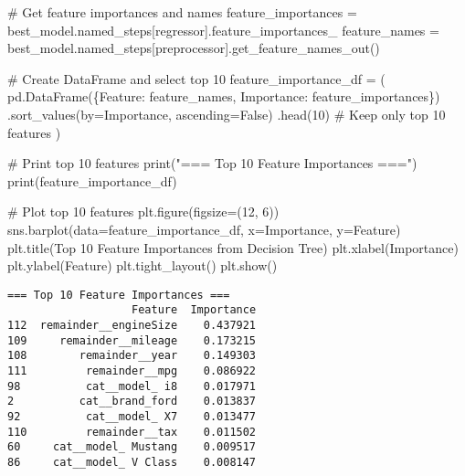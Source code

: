 \documentclass[
  letterpaper,
  DIV=11,
  numbers=noendperiod]{scrreprt}
\newenvironment{Shaded}{\begin{snugshade}}{\end{snugshade}}
\newcommand{\BuiltInTok}[1]{\textcolor[rgb]{0.00,0.23,0.31}{#1}}
\newcommand{\CommentTok}[1]{\textcolor[rgb]{0.37,0.37,0.37}{#1}}
\newcommand{\DecValTok}[1]{\textcolor[rgb]{0.68,0.00,0.00}{#1}}
\newcommand{\NormalTok}[1]{\textcolor[rgb]{0.00,0.23,0.31}{#1}}
\newcommand{\OperatorTok}[1]{\textcolor[rgb]{0.37,0.37,0.37}{#1}}
\newcommand{\StringTok}[1]{\textcolor[rgb]{0.13,0.47,0.30}{#1}}
\newcommand{\VariableTok}[1]{\textcolor[rgb]{0.07,0.07,0.07}{#1}}
\begin{document}
\begin{Shaded}
\begin{Highlighting}[]
\CommentTok{\# Get feature importances and names}
\NormalTok{feature\_importances }\OperatorTok{=}\NormalTok{ best\_model.named\_steps[}\StringTok{\textquotesingle{}regressor\textquotesingle{}}\NormalTok{].feature\_importances\_}
\NormalTok{feature\_names }\OperatorTok{=}\NormalTok{ best\_model.named\_steps[}\StringTok{\textquotesingle{}preprocessor\textquotesingle{}}\NormalTok{].get\_feature\_names\_out()}

\CommentTok{\# Create DataFrame and select top 10}
\NormalTok{feature\_importance\_df }\OperatorTok{=}\NormalTok{ (}
\NormalTok{    pd.DataFrame(\{}\StringTok{\textquotesingle{}Feature\textquotesingle{}}\NormalTok{: feature\_names, }\StringTok{\textquotesingle{}Importance\textquotesingle{}}\NormalTok{: feature\_importances\})}
\NormalTok{    .sort\_values(by}\OperatorTok{=}\StringTok{\textquotesingle{}Importance\textquotesingle{}}\NormalTok{, ascending}\OperatorTok{=}\VariableTok{False}\NormalTok{)}
\NormalTok{    .head(}\DecValTok{10}\NormalTok{)  }\CommentTok{\# Keep only top 10 features}
\NormalTok{)}

\CommentTok{\# Print top 10 features}
\BuiltInTok{print}\NormalTok{(}\StringTok{"=== Top 10 Feature Importances ==="}\NormalTok{)}
\BuiltInTok{print}\NormalTok{(feature\_importance\_df)}

\CommentTok{\# Plot top 10 features}
\NormalTok{plt.figure(figsize}\OperatorTok{=}\NormalTok{(}\DecValTok{12}\NormalTok{, }\DecValTok{6}\NormalTok{))}
\NormalTok{sns.barplot(data}\OperatorTok{=}\NormalTok{feature\_importance\_df, x}\OperatorTok{=}\StringTok{\textquotesingle{}Importance\textquotesingle{}}\NormalTok{, y}\OperatorTok{=}\StringTok{\textquotesingle{}Feature\textquotesingle{}}\NormalTok{)}
\NormalTok{plt.title(}\StringTok{\textquotesingle{}Top 10 Feature Importances from Decision Tree\textquotesingle{}}\NormalTok{)}
\NormalTok{plt.xlabel(}\StringTok{\textquotesingle{}Importance\textquotesingle{}}\NormalTok{)}
\NormalTok{plt.ylabel(}\StringTok{\textquotesingle{}Feature\textquotesingle{}}\NormalTok{)}
\NormalTok{plt.tight\_layout()}
\NormalTok{plt.show()}
\end{Highlighting}
\end{Shaded}

\begin{verbatim}
=== Top 10 Feature Importances ===
                   Feature  Importance
112  remainder__engineSize    0.437921
109     remainder__mileage    0.173215
108        remainder__year    0.149303
111         remainder__mpg    0.086922
98          cat__model_ i8    0.017971
2          cat__brand_ford    0.013837
92          cat__model_ X7    0.013477
110         remainder__tax    0.011502
60     cat__model_ Mustang    0.009517
86     cat__model_ V Class    0.008147
\end{verbatim}
\end{document}
